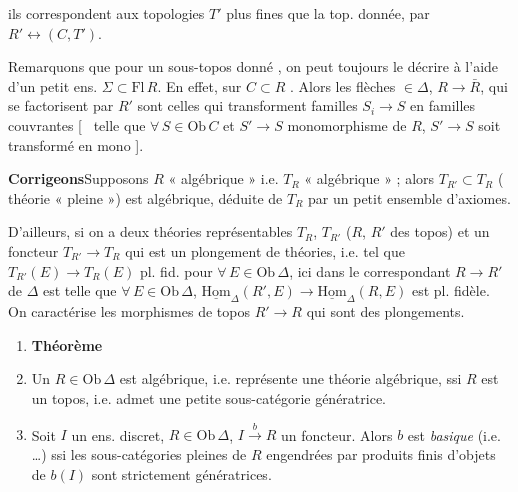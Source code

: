 \documentclass[11pt,a4paper]{article}
\begin{document}

ils correspondent aux topologies $T'$   plus fines que
la top. donnée, par $R' \longleftrightarrow (C, T')$.

Remarquons que pour un sous-topos donné , on peut toujours le décrire à
l'aide d'un petit ens. $\Sigma \subset \mathrm{Fl}\,R$. En effet, sur
$C \subset R$   \ill{}. Alors les flèches
$\in \Delta$, $R \to \bar{R}$, qui se factorisent par $R'$ sont celles qui
transforment familles  $S_i \to S$ \struck{\ill{}}
 en familles
couvrantes [\ \ill{}  telle que $\forall\, S \in \mathrm{Ob}\,C$ et
$S' \to S$ monomorphisme de \struck{\ill{}} $R$, $S' \to S$ soit transformé en
mono ].

\textbf{Corrigeons}\quad Supposons $R$ « algébrique » i.e. $T_R$
 « algébrique » ; alors $T_{R'} \subset T_R$
( \ill{} théorie « pleine ») est algébrique, déduite de
$T_R$ par un petit ensemble d'axiomes.

D'ailleurs, si on a deux théories représentables $T_R$, $T_{R'}$ ($R$, $R'$ des
topos) et un foncteur $T_{R'} \to T_R$ qui est un plongement de théories, i.e.
tel que \struck{\ill{}} $T_{R'}(E) \to T_R(E)$ pl. fid. pour
$\forall\, E \in \mathrm{Ob}\,\Delta$, ici \ill{} \ill{} dans le \ill{}
correspondant $R \to R'$ de $\Delta$ est telle que
$\forall\, E \in \mathrm{Ob}\,\Delta$,
$\underline{\mathrm{Hom}}_{\Delta}(R', E) \to \underline{\mathrm{Hom}}_{\Delta}(R, E)$
est pl. fidèle. On \ill{} caractérise les morphismes de topos $R' \to R$ qui sont
des plongements.

\begin{enumerate}
  \item[$4$)] \textbf{Théorème}
  \item[a)] Un $R \in \mathrm{Ob}\,\Delta$ est \ill{} algébrique, i.e.
    représente une théorie algébrique, ssi $R$ est un topos, i.e. admet une
    petite sous-catégorie génératrice.
  \item[b)] Soit $I$ un ens. discret, $R \in \mathrm{Ob}\,\Delta$,
    $I \xrightarrow{\ b\ } R$ un foncteur. Alors $b$ est \emph{basique}
    (i.e. …)   
    ssi les sous-catégories pleines de $R$ engendrées par produits finis
    d'objets de $b(I)$ sont strictement génératrices.
\end{enumerate}
\end{document}
